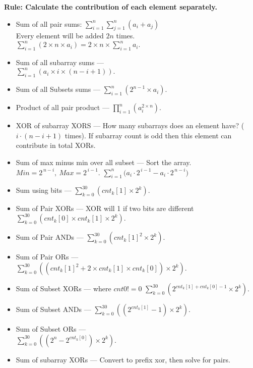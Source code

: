 \vspace{-4.5mm}
{\small
\textbf{Rule: Calculate the contribution of each element separately.}
\begin{itemize}
\item Sum of all pair sums: $\sum_{i=1}^{n} \sum_{j=1}^{n} (a_i + a_j)$\\
Every element will be added $2n$ times.
$\sum_{i=1}^{n} (2 \times n \times a_{i}) = 2 \times n \times \sum_{i=1}^{n} a_{i}.$
\item Sum of all subarray sums — \\
$\sum_{i=1}^{n} \left(a_{i} \times i \times (n - i + 1)\right).$
\item Sum of all Subsets sums —
$\sum_{i=1}^{n} \left(2^{n-1} \times a_{i}\right).$
\item Product of all pair product —
$\prod_{i=1}^{n} \left(a_{i}^{2 \times n}\right).$
\item XOR of subarray XORS — How many subarrays does an element have? ($i \cdot (n - i + 1)$ times). If subarray count is odd then this element can contribute in total XORs.
\item Sum of max minus min over all subset — Sort the array. $Min = 2^{\,n-i}, \ Max = 2^{\,i-1}$. $\sum_{i=1}^{n} \big(a_i \cdot 2^{\,i-1} - a_i \cdot 2^{\,n-i}\big)$
\item Sum using bits —
$\sum_{k=0}^{30} \left(cnt_{k}[1] \times 2^{k}\right).$
\item Sum of Pair XORs — XOR will 1 if two bits
are different
$\sum_{k=0}^{30} \left(cnt_{k}[0] \times cnt_{k}[1] \times 2^{k}\right).$
\item Sum of Pair ANDs — 
$\sum_{k=0}^{30} \left(cnt_{k}[1]^2 \times 2^{k}\right).$
\item Sum of Pair ORs — \\
$\sum_{k=0}^{30} \left( \left( cnt_{k}[1]^{2} + 2 \times cnt_{k}[1] \times cnt_{k}[0] \right) \times 2^{k} \right).$
\item Sum of Subset XORs — where $cnt0 != 0$
$\sum_{k=0}^{30} \left(2^{cnt_{k}[1] + cnt_{k}[0] - 1} \times 2^{k}\right).$
\item Sum of Subset ANDs — 
$\sum_{k=0}^{30} \left( \left(2^{cnt_{k}[1]} - 1\right) \times 2^{k} \right).$
\item Sum of Subset ORs — \\
$\sum_{k=0}^{30} \left( \left(2^{n} - 2^{cnt_{k}[0]}\right) \times 2^{k} \right).$
\item Sum of subarray XORs — Convert to prefix xor, then solve for pairs.
\end{itemize}
}
